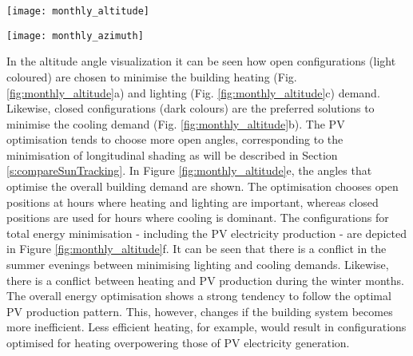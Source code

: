 	\begin{figure*}
		\begin{center}
		\texttt{[image: monthly\_altitude]}
		\caption{Carpet plots detailing the optimal altitude angles to minimise the (a) heating demand, (b) cooling demand, (c) lighting demand, and (d) maximise PV electricity production. Figure (e) details the combinations for optimum building thermal management without PV production, (f) also includes the PV production. Small angles correspond to closed positions, whereas large angles represent open positions. The corresponding azimuth angles for each hour can be seen in the following Figure (\ref{fig:monthly_azimuth}).}
		\label{fig:monthly_altitude}
		\end{center}
	\end{figure*}

	\begin{figure*}
		\begin{center}
		\texttt{[image: monthly\_azimuth]}
		\caption{Carpet plots detailing the optimal azimuth angles to minimise the (a) heating demand, (b) cooling demand, (c) lighting demand, and (d) maximise PV electricity production. Figure (e) details the combinations for optimum building thermal management without PV production, (f) also includes the PV production. Negative angles correspond to the panels facing west, whereas positive angles represent east-facing panels. The corresponding altitude angles for each hour can be seen in the previous Figure (\ref{fig:monthly_altitude}).}
		\label{fig:monthly_azimuth}
		\end{center}
	\end{figure*}

	In the altitude angle visualization it can be seen how open configurations (light coloured) are chosen to minimise the building heating (Fig. \ref{fig:monthly_altitude}a) and lighting (Fig. \ref{fig:monthly_altitude}c) demand. Likewise, closed configurations (dark colours) are the preferred solutions to minimise the cooling demand (Fig. \ref{fig:monthly_altitude}b). The PV optimisation tends to choose more open angles, corresponding to the minimisation of longitudinal shading as will be described in Section \ref{s:compareSunTracking}. In Figure \ref{fig:monthly_altitude}e, the angles that optimise the overall building demand are shown. The optimisation chooses open positions at hours where heating and lighting are important, whereas closed positions are used for hours where cooling is dominant. The configurations for total energy minimisation - including the PV electricity production - are depicted in Figure \ref{fig:monthly_altitude}f. It can be seen that there is a conflict in the summer evenings between minimising lighting and cooling demands. Likewise, there is a conflict between heating and PV production during the winter months. The overall energy optimisation shows a strong tendency to follow the optimal PV production pattern. This, however, changes if the building system becomes more inefficient. Less efficient heating, for example, would result in configurations optimised for heating overpowering those of PV electricity generation.

